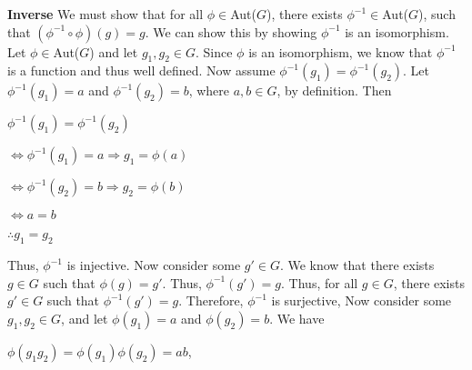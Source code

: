 \documentclass[12pt, a4paper]{article}
\begin{document}
\begin{description}
\vspace{4mm}

    \item \textbf{Inverse }We must show that for all $\phi\in$Aut($G$), there exists $\phi^{-1}\in$Aut($G$), such that $(\phi^{-1}\circ\phi)(g)=g$. We can show this by showing $\phi^{-1}$ is an isomorphism. Let $\phi\in$Aut($G$) and let $g_1,g_2\in G$. Since $\phi$ is an isomorphism, we know that $\phi^{-1}$ is a function and thus well defined. Now assume $\phi^{-1}(g_1)=\phi^{-1}(g_2)$. Let $\phi^{-1}(g_1)=a$ and $\phi^{-1}(g_2)=b$, where $a,b\in G$, by definition. Then\par
    
\vspace{4mm}

\hspace{10mm} $\phi^{-1}(g_1)=\phi^{-1}(g_2)$

\vspace{2mm}

\hspace{18mm} $\Leftrightarrow\phi^{-1}(g_1)=a\Rightarrow g_1=\phi(a)$

\vspace{2mm}

\hspace{18mm} $\Leftrightarrow\phi^{-1}(g_2)=b\Rightarrow g_2=\phi(b)$

\vspace{2mm} 

\hspace{18mm} $\Leftrightarrow a=b$

\vspace{2mm}

\hspace{18mm} $\therefore g_1=g_2$

\vspace{4mm}

    Thus, $\phi^{-1}$ is injective. Now consider some $g'\in G$. We know that there exists $g\in G$ such that $\phi(g)=g'$. Thus, $\phi^{-1}(g')=g$. Thus, for all $g\in G$, there exists $g'\in G$ such that $\phi^{-1}(g')=g$. Therefore, $\phi^{-1}$ is surjective, Now consider some $g_1,g_2\in G$, and let $\phi(g_1)=a$ and $\phi(g_2)=b$. We have\par
    
\vspace{4mm}

        \centerline{$\phi(g_1g_2)=\phi(g_1)\phi(g_2)=ab$,}
        
\vspace{4mm}


\end{description}
\end{document}

